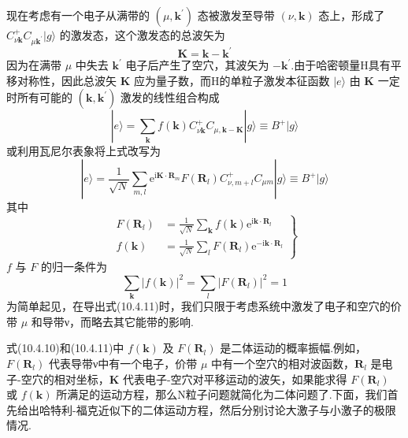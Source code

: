 现在考虑有一个电子从满带的 $(\mu,\boldsymbol{k}^{\prime})$ 态被激发至导带 $(\nu,\boldsymbol{k})$ 态上，形成了 $C_{\nu\boldsymbol{k}}^{+}C_{\mu\boldsymbol{k}^{\prime}}|g\rangle$ 的激发态，这个激发态的总波矢为
\begin{equation}
  \boldsymbol{K}=\boldsymbol{k}-\boldsymbol{k}^{\prime}
\end{equation}
因为在满带 $\mu$ 中失去 $\boldsymbol{k}^{\prime}$ 电子后产生了空穴，其波矢为 $-\boldsymbol{k}^{\prime}$.由于哈密顿量H具有平移对称性，因此总波矢 $\boldsymbol{K}$ 应为量子数，而H的单粒子激发本征函数 $|e\rangle$ 由 $\boldsymbol{K}$ 一定时所有可能的 $(\boldsymbol{k},\boldsymbol{k}^{\prime})$ 激发的线性组合构成
\begin{equation}
  |e\rangle=\sum_{\boldsymbol{k}}f(\boldsymbol{k})
  C_{\nu\boldsymbol{k}}^{+}C_{\mu,\boldsymbol{k}-\boldsymbol{K}}|g\rangle
  \equiv B^{+}|g\rangle
\end{equation}
或利用瓦尼尔表象将上式改写为
\begin{equation}
  |e\rangle=\frac{1}{\sqrt{N}}\sum_{m,l}
  \mathrm{e}^{\mathrm{i}\boldsymbol{K}\cdot\boldsymbol{R}_{m}}F(\boldsymbol{R}_{l})
  C_{\nu,m+l}^{+}C_{\mu m}|g\rangle\equiv B^{+}|g\rangle
\end{equation}
其中
\begin{equation}
\left.
\begin{aligned}
  F(\boldsymbol{R}_{l})&=\frac{1}{\sqrt{N}}\sum_{\boldsymbol{k}}f(\boldsymbol{k})
  \mathrm{e}^{\mathrm{i}\boldsymbol{k}\cdot\boldsymbol{R}_{l}}\\
  f(\boldsymbol{k})&=\frac{1}{\sqrt{N}}\sum_{l}F(\boldsymbol{R}_{l})
  \mathrm{e}^{-\mathrm{i}\boldsymbol{k}\cdot\boldsymbol{R}_{l}}
\end{aligned}\right\}
\end{equation}
$f$ 与 $F$ 的归一条件为
\begin{equation}
  \sum_{\boldsymbol{k}}|f(\boldsymbol{k})|^{2}
  =\sum_{l}|F(\boldsymbol{R}_{l})|^{2}=1
\end{equation}
为简单起见，在导出式(10.4.11)时，我们只限于考虑系统中激发了电子和空穴的价带 $\mu$ 和导带ν，而略去其它能带的影响.

式(10.4.10)和(10.4.11)中 $f(\boldsymbol{k})$ 及 $F(\boldsymbol{R}_{l})$ 是二体运动的概率振幅.例如，$F(\boldsymbol{R}_{l})$ 代表导带ν中有一个电子，价带 $\mu$ 中有一个空穴的相对波函数，$\boldsymbol{R}_{l}$ 是电子-空穴的相对坐标，$\boldsymbol{K}$ 代表电子-空穴对平移运动的波矢，如果能求得 $F(\boldsymbol{R}_{l})$ 或 $f(\boldsymbol{k})$ 所满足的运动方程，那么N粒子问题就简化为二体问题了.下面，我们首先给出哈特利-福克近似下的二体运动方程，然后分别讨论大激子与小激子的极限情况.

